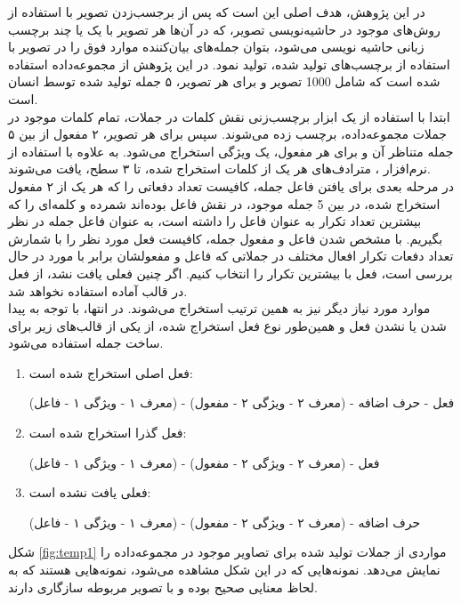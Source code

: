 در این پژوهش، هدف اصلی این است که پس از برجسب‌زدن تصویر با استفاده از روش‌‌های موجود در حاشیه‌نویسی تصویر، که در آن‌ها هر تصویر با یک یا چند برچسب زبانی حاشیه نویسی می‌شود، بتوان جمله‌های بیان‌کننده موارد فوق را در تصویر با استفاده از برچسب‌های تولید شده، تولید نمود.
در این پژوهش از مجموعه‌داده  استفاده شده است که شامل 1000 تصویر و برای هر تصویر، ۵ جمله تولید شده توسط انسان است. 
\\
ابتدا با استفاده از یک ابزار برچسب‌زنی نقش کلمات در جملات، تمام کلمات موجود در جملات مجموعه‌داده، برچسب‌ زده می‌شوند. سپس برای هر تصویر، ۲ مفعول از بین ۵ جمله متناظر آن و برای هر مفعول، یک ویژگی استخراج می‌شود. به علاوه با استفاده از نرم‌افزار ، مترادف‌های هر یک از کلمات استخراج شده، تا ۳ سطح، یافت می‌شوند.
\\
در مرحله بعدی برای یافتن فاعل جمله، کافیست تعداد دفعاتی را که هر یک از ۲ مفعول استخراج شده، در بین 5 جمله موجود، در نقش فاعل بوده‌اند شمرده و کلمه‌ای را که بیشترین تعداد تکرار به عنوان فاعل را داشته است، به عنوان فاعل جمله در نظر بگیریم. با مشخص شدن فاعل و مفعول جمله، کافیست فعل مورد نظر را با شمارش تعداد دفعات تکرار افعال مختلف در جملاتی که فاعل و مفعولشان برابر با مورد در حال بررسی است، فعل با بیشترین تکرار را انتخاب کنیم. اگر چنین فعلی یافت نشد، از فعل در قالب آماده استفاده نخواهد شد.
\\
موارد مورد نیاز دیگر نیز به همین ترتیب استخراج می‌شوند. در انتها، با توجه به پیدا شدن یا نشدن فعل و همین‌طور نوع فعل استخراج شده، از یکی از قالب‌های زیر برای ساخت جمله استفاده می‌شود.
\begin{enumerate}
\item فعل اصلی استخراج شده است:
\begin{center}
(معرف ۱ - ویژگی ۱ - فاعل) - فعل - حرف اضافه - (معرف ۲ - ویژگی ۲ - مفعول)
\end{center}
\item فعل گذرا استخراج شده است:
\begin{center}
(معرف ۱ - ویژگی ۱ - فاعل) - فعل - (معرف ۲ - ویژگی ۲ - مفعول)
\end{center}
\item فعلی یافت نشده است:
\begin{center}
(معرف ۱ - ویژگی ۱ - فاعل) - حرف اضافه - (معرف ۲ - ویژگی ۲ - مفعول)
\end{center}
\end{enumerate}

شکل \ref{fig:temp1} مواردی از جملات تولید شده برای تصاویر موجود در مجموعه‌داده را نمایش می‌دهد. نمونه‌هایی که در این شکل مشاهده می‌شود، نمونه‌هایی هستند که به لحاظ معنایی صحیح بوده و با تصویر مربوطه سازگاری دارند.

